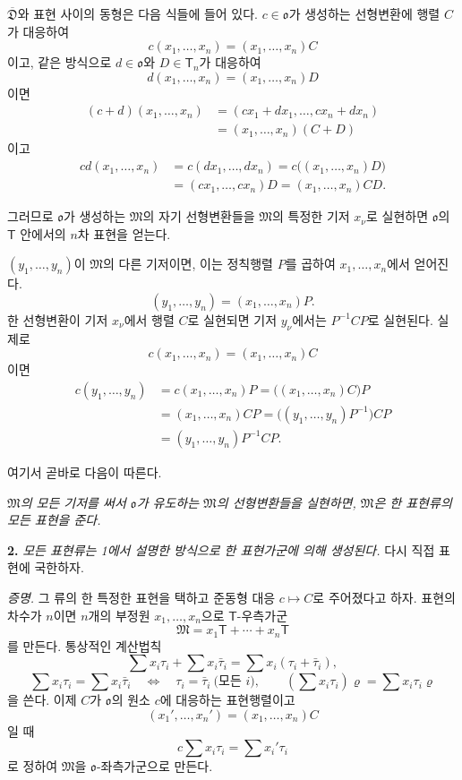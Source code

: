 \(\overline{\mathfrak D}\)와 표현 사이의 동형은 다음 식들에 들어 있다. \(c\in\mathfrak{o}\)가 생성하는 선형변환에 행렬 \(C\)가 대응하여
\[
        c(x_1,\ldots,x_n)=(x_1,\ldots,x_n)C
\]
이고, 같은 방식으로 \(d\in\mathfrak{o}\)와 \(D\in\mathsf T_n\)가 대응하여
\[
        d(x_1,\ldots,x_n)=(x_1,\ldots,x_n)D
\]
이면
\[
\begin{aligned}
(c+d)(x_1,\ldots,x_n)
&=(cx_1+dx_1,\ldots,cx_n+dx_n)\\
&=(x_1,\ldots,x_n)(C+D)
\end{aligned}
\]
이고
\[
\begin{aligned}
cd(x_1,\ldots,x_n)
&=c(dx_1,\ldots,dx_n)
 =c\bigl((x_1,\ldots,x_n)D\bigr)\\
&=(cx_1,\ldots,cx_n)D
 =(x_1,\ldots,x_n)CD.
\end{aligned}
\]

그러므로 \(\mathfrak{o}\)가 생성하는 \(\mathfrak M\)의 자기 선형변환들을 \(\mathfrak M\)의 특정한 기저 \(x_\nu\)로 실현하면 \(\mathfrak{o}\)의 \(\mathsf T\) 안에서의 \(n\)차 표현을 얻는다.

\((y_1,\ldots,y_n)\)이 \(\mathfrak M\)의 다른 기저이면, 이는 정칙행렬 \(P\)를 곱하여 \(x_1,\ldots,x_n\)에서 얻어진다.
\[
        (y_1,\ldots,y_n)=(x_1,\ldots,x_n)P.
\]
한 선형변환이 기저 \(x_\nu\)에서 행렬 \(C\)로 실현되면 기저 \(y_\nu\)에서는 \(P^{-1}CP\)로 실현된다. 실제로
\[
        c(x_1,\ldots,x_n)=(x_1,\ldots,x_n)C
\]
이면
\[
\begin{aligned}
c(y_1,\ldots,y_n)
&=c(x_1,\ldots,x_n)P
 =\bigl((x_1,\ldots,x_n)C\bigr)P\\
&=(x_1,\ldots,x_n)CP
 =\bigl((y_1,\ldots,y_n)P^{-1}\bigr)CP\\
&=(y_1,\ldots,y_n)P^{-1}CP.
\end{aligned}
\]

여기서 곧바로 다음이 따른다.

\emph{\(\mathfrak M\)의 모든 기저를 써서 \(\mathfrak{o}\)가 유도하는 \(\mathfrak M\)의 선형변환들을 실현하면, \(\mathfrak M\)은 한 표현류의 모든 표현을 준다.}

\textbf{2.} \emph{모든 표현류는 1에서 설명한 방식으로 한 표현가군에 의해 생성된다.} 다시 직접 표현에 국한하자.

\emph{증명.} 그 류의 한 특정한 표현을 택하고 준동형 대응 \(c\mapsto C\)로 주어졌다고 하자. 표현의 차수가 \(n\)이면 \(n\)개의 부정원 \(x_1,\ldots,x_n\)으로 \(\mathsf T\)-우측가군
\[
        \mathfrak M=x_1\mathsf T+\cdots+x_n\mathsf T
\]
를 만든다. 통상적인 계산법칙
\[
\sum x_i\tau_i+\sum x_i\bar\tau_i
 =\sum x_i(\tau_i+\bar\tau_i),
\]
\[
\sum x_i\tau_i=\sum x_i\bar\tau_i
\quad\Longleftrightarrow\quad
\tau_i=\bar\tau_i\ \text{(모든 \(i\))},
\qquad
\left(\sum x_i\tau_i\right)\varrho
=\sum x_i\tau_i\varrho
\]
을 쓴다. 이제 \(C\)가 \(\mathfrak{o}\)의 원소 \(c\)에 대응하는 표현행렬이고
\[
        (x_1',\ldots,x_n')=(x_1,\ldots,x_n)C
\]
일 때
\[
        c\sum x_i\tau_i=\sum x_i'\tau_i
\]
로 정하여 \(\mathfrak M\)을 \(\mathfrak{o}\)-좌측가군으로 만든다.

